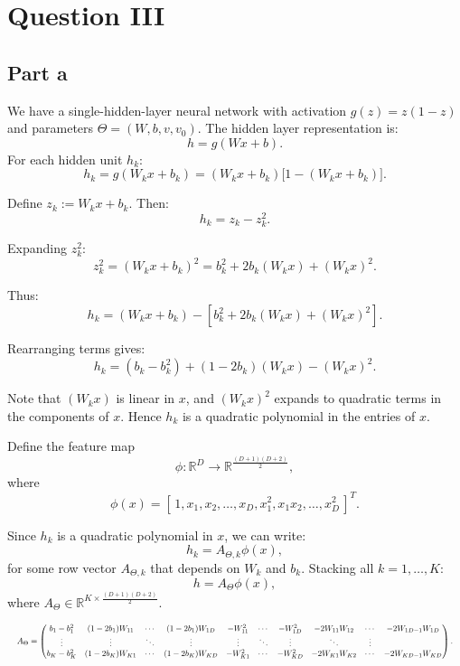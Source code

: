 \section{Question III}

\subsection{Part a}

We have a single-hidden-layer neural network with activation $g(z) = z(1 - z)$ and parameters 
\(\Theta = (W, b, v, v_0)\). The hidden layer representation is:
\[
h = g(Wx + b).
\]
For each hidden unit $h_k$:
\[
h_k = g(W_k x + b_k) = (W_k x + b_k)\bigl[1 - (W_k x + b_k)\bigr].
\]

Define $z_k := W_k x + b_k$. Then:
\[
h_k = z_k - z_k^2.
\]

Expanding $z_k^2$:
\[
z_k^2 = (W_k x + b_k)^2 = b_k^2 + 2 b_k (W_k x) + (W_k x)^2.
\]

Thus:
\[
h_k = (W_k x + b_k) - \left[b_k^2 + 2 b_k (W_k x) + (W_k x)^2\right].
\]

Rearranging terms gives:
\[
h_k = (b_k - b_k^2) + (1 - 2b_k)(W_k x) - (W_k x)^2.
\]

Note that $(W_k x)$ is linear in $x$, and $(W_k x)^2$ expands to quadratic terms in the components of $x$. Hence $h_k$ is a quadratic polynomial in the entries of $x$.

Define the feature map 
\[
\phi: \mathbb{R}^D \to \mathbb{R}^{\frac{(D+1)(D+2)}{2}},
\]
where
\[
\phi(x) = [\,1, x_1, x_2, \ldots, x_D, x_1^2, x_1 x_2, \ldots, x_D^2\,]^T.
\]

Since $h_k$ is a quadratic polynomial in $x$, we can write:
\[
h_k = A_{\Theta,k} \phi(x),
\]
for some row vector $A_{\Theta,k}$ that depends on $W_k$ and $b_k$. Stacking all $k=1,\ldots,K$:
\[
h = A_{\Theta} \phi(x),
\]
where $A_{\Theta} \in \mathbb{R}^{K \times \frac{(D+1)(D+2)}{2}}$.


\[
\resizebox{\columnwidth}{!}{$
    A_\Theta =
    \begin{pmatrix}
        b_1 - b_1^2 & (1 - 2b_1)W_{11} & \cdots & (1 - 2b_1)W_{1D} & -W_{11}^2 & \cdots & -W_{1D}^2 & -2W_{11}W_{12} & \cdots & -2W_{1D-1}W_{1D} \\
        \vdots & \vdots & \ddots & \vdots & \vdots & \ddots & \vdots & \ddots & \vdots \\
        b_K - b_K^2 & (1 - 2b_K)W_{K1} & \cdots & (1 - 2b_K)W_{KD} & -W_{K1}^2 & \cdots & -W_{KD}^2 & -2W_{K1}W_{K2} & \cdots & -2W_{KD-1}W_{KD}
    \end{pmatrix}.
$}
\]

